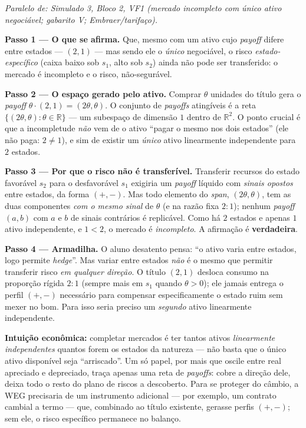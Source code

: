 \begin{solucao}
{\footnotesize\textit{Paralelo de: Simulado 3, Bloco 2, VF1 (mercado incompleto com único ativo negociável; gabarito V; Embraer/tarifaço).}}\par\vspace{0.2em}
\textbf{Passo 1 --- O que se afirma.} Que, mesmo com um ativo cujo \emph{payoff} difere entre estados --- $(2,1)$ --- mas sendo ele o \emph{único} negociável, o risco \emph{estado-específico} (caixa baixo sob $s_1$, alto sob $s_2$) ainda não pode ser transferido: o mercado é incompleto e o risco, não-segurável.

\textbf{Passo 2 --- O espaço gerado pelo ativo.} Comprar $\theta$ unidades do título gera o \emph{payoff} $\theta\cdot(2,1)=(2\theta,\theta)$. O conjunto de \emph{payoffs} atingíveis é a reta $\{(2\theta,\theta):\theta\in\mathbb{R}\}$ --- um subespaço de dimensão $1$ dentro de $\mathbb{R}^2$. O ponto crucial é que a incompletude \emph{não} vem de o ativo ``pagar o mesmo nos dois estados'' (ele não paga: $2\neq 1$), e sim de existir um \emph{único} ativo linearmente independente para $2$ estados.

\textbf{Passo 3 --- Por que o risco não é transferível.} Transferir recursos do estado favorável $s_2$ para o desfavorável $s_1$ exigiria um \emph{payoff} líquido com \emph{sinais opostos} entre estados, da forma $(+,-)$. Mas todo elemento do \emph{span}, $(2\theta,\theta)$, tem as duas componentes \emph{com o mesmo sinal} de $\theta$ (e na razão fixa $2:1$); nenhum \emph{payoff} $(a,b)$ com $a$ e $b$ de sinais contrários é replicável. Como há $2$ estados e apenas $1$ ativo independente, e $1<2$, o mercado é \emph{incompleto}. A afirmação é \textbf{verdadeira}.

\textbf{Passo 4 --- Armadilha.} O aluno desatento pensa: ``o ativo varia entre estados, logo permite \emph{hedge}''. Mas variar entre estados \emph{não} é o mesmo que permitir transferir risco \emph{em qualquer direção}. O título $(2,1)$ desloca consumo na proporção rígida $2:1$ (sempre mais em $s_1$ quando $\theta>0$); ele jamais entrega o perfil $(+,-)$ necessário para compensar especificamente o estado ruim sem mexer no bom. Para isso seria preciso um \emph{segundo} ativo linearmente independente.

\textbf{Intuição econômica:} completar mercados é ter tantos ativos \emph{linearmente independentes} quantos forem os estados da natureza --- não basta que o único ativo disponível seja ``arriscado''. Um só papel, por mais que oscile entre real apreciado e depreciado, traça apenas uma reta de \emph{payoffs}: cobre a direção dele, deixa todo o resto do plano de riscos a descoberto. Para se proteger do câmbio, a WEG precisaria de um instrumento adicional --- por exemplo, um contrato cambial a termo --- que, combinado ao título existente, gerasse perfis $(+,-)$; sem ele, o risco específico permanece no balanço.
\end{solucao}

